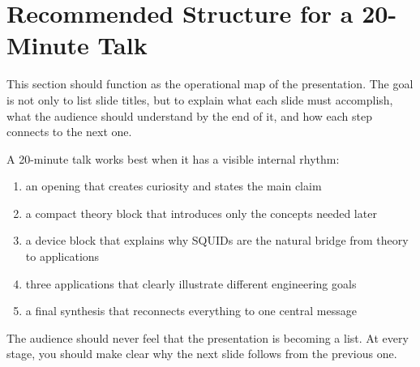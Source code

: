 \documentclass[11pt,a4paper]{article}
\begin{document}
\section{Recommended Structure for a 20-Minute Talk}

This section should function as the operational map of the presentation. The goal is not only to list slide titles, but to explain what each slide must accomplish, what the audience should understand by the end of it, and how each step connects to the next one.

A 20-minute talk works best when it has a visible internal rhythm:
\begin{enumerate}
  \item an opening that creates curiosity and states the main claim
  \item a compact theory block that introduces only the concepts needed later
  \item a device block that explains why SQUIDs are the natural bridge from theory to applications
  \item three applications that clearly illustrate different engineering goals
  \item a final synthesis that reconnects everything to one central message
\end{enumerate}
The audience should never feel that the presentation is becoming a list. At every stage, you should make clear why the next slide follows from the previous one.
\end{document}
